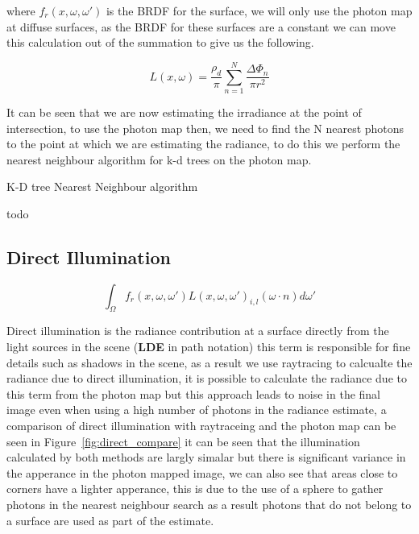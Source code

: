 where $f_r(x, \omega,\omega')$ is the BRDF for the surface, we will only use the photon map at diffuse surfaces, as the BRDF
for these surfaces are a constant we can move this calculation out of the summation to give us the following.

\begin{equation}
L(x, \omega) = \frac{\rho_d}{\pi}\sum\limits_{n = 1}^N \frac{\Delta\Phi_n}{\pi r ^ 2}
\end{equation}

It can be seen that we are now estimating the irradiance at the point of intersection, to use the photon map then, we need to
find the N nearest photons to the point at which we are estimating the radiance, to do this we perform the nearest neighbour
algorithm for k-d trees on the photon map.

\begin{algorithm}
\begin{algorithmic}
\caption{K-D tree Nearest Neighbour algorithm}
\State todo
\end{algorithmic}
\end{algorithm}

\subsection{Direct Illumination}
\begin{equation*}
			\int_{\Omega}
				f_{r}(x, \omega, \omega')
				L(x,\omega,\omega')_{i,l}
				(\omega \cdot n)d\omega'
\end{equation*}

Direct illumination is the radiance contribution at a surface directly from the light sources in the scene
(\textbf{LDE} in path notation) this term is responsible for fine details such as shadows in the scene, as a
result we use raytracing to calcualte
the radiance due to direct illumination, it is possible to calculate the radiance due to this term from the photon map but this
approach leads to noise in the final image even when using a high number of photons in the radiance estimate, a comparison of
direct illumination with raytraceing and the photon map can be seen in Figure~\ref{fig:direct_compare} it can be seen that
the illumination calculated by both methods are largly simalar but there is significant variance in the apperance in the
photon mapped image, we can also see that areas close to corners have a lighter apperance, this is due to the use of a
sphere to gather photons in the nearest neighbour search as a result photons that do not belong to a surface are used
as part of the estimate.

